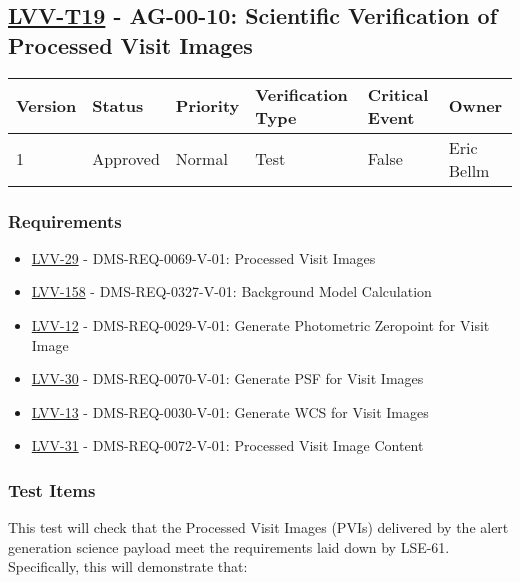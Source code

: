 \subsection{\href{https://jira.lsstcorp.org/secure/Tests.jspa\#/testCase/LVV-T19}{LVV-T19}
    - AG-00-10: Scientific Verification of Processed Visit Images}\label{lvv-t19}

\begin{longtable}[]{llllll}
\toprule
Version & Status & Priority & Verification Type & Critical Event & Owner
\\\midrule
1 & Approved & Normal &
Test & False & Eric Bellm
\\\bottomrule
\end{longtable}

\subsubsection{Requirements}
\begin{itemize}
\item \href{https://jira.lsstcorp.org/browse/LVV-29}{LVV-29} - DMS-REQ-0069-V-01: Processed Visit Images
\item \href{https://jira.lsstcorp.org/browse/LVV-158}{LVV-158} - DMS-REQ-0327-V-01: Background Model Calculation
\item \href{https://jira.lsstcorp.org/browse/LVV-12}{LVV-12} - DMS-REQ-0029-V-01: Generate Photometric Zeropoint for Visit Image
\item \href{https://jira.lsstcorp.org/browse/LVV-30}{LVV-30} - DMS-REQ-0070-V-01: Generate PSF for Visit Images
\item \href{https://jira.lsstcorp.org/browse/LVV-13}{LVV-13} - DMS-REQ-0030-V-01: Generate WCS for Visit Images
\item \href{https://jira.lsstcorp.org/browse/LVV-31}{LVV-31} - DMS-REQ-0072-V-01: Processed Visit Image Content
\end{itemize}

\subsubsection{Test Items}
This test will check that the Processed Visit Images (PVIs) delivered by
the alert generation science payload meet the requirements laid down by
LSE-61.\\
Specifically, this will demonstrate that:

